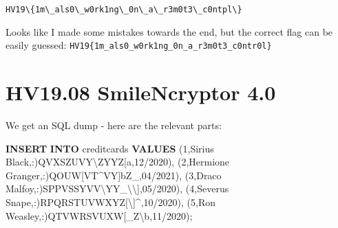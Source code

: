 \documentclass[11pt]{article}
\newenvironment{Shaded}{}{}
\newcommand{\KeywordTok}[1]{\textcolor[rgb]{0.00,0.44,0.13}{\textbf{{#1}}}}
\newcommand{\DecValTok}[1]{\textcolor[rgb]{0.25,0.63,0.44}{{#1}}}
\newcommand{\CharTok}[1]{\textcolor[rgb]{0.25,0.44,0.63}{{#1}}}
\newcommand{\StringTok}[1]{\textcolor[rgb]{0.25,0.44,0.63}{{#1}}}
\newcommand{\NormalTok}[1]{{#1}}
\begin{document}
    \begin{Verbatim}[commandchars=\\\{\}]
HV19\{1m\_als0\_w0rk1ng\_0n\_a\_r3m0t3\_c0ntpl\}
    \end{Verbatim}

    Looks like I made some mistakes towards the end, but the correct flag
can be easily guessed:
\texttt{HV19\{1m\_als0\_w0rk1ng\_0n\_a\_r3m0t3\_c0ntr0l\}}

    
\pagebreak{}
    \hypertarget{hv19.08-smilencryptor-4.0}{%
\section{HV19.08 SmileNcryptor 4.0}\label{hv19.08-smilencryptor-4.0}}

We get an SQL dump - here are the relevant parts:

\begin{Shaded}
\begin{Highlighting}[]
\KeywordTok{INSERT} \KeywordTok{INTO}\NormalTok{ \textasciigrave{}creditcards\textasciigrave{} }\KeywordTok{VALUES} 
\NormalTok{(}\DecValTok{1}\NormalTok{,}\StringTok{\textquotesingle{}Sirius Black\textquotesingle{}}\NormalTok{,}\StringTok{\textquotesingle{}:)QVXSZUVY\textbackslash{}ZYYZ[a\textquotesingle{}}\NormalTok{,}\StringTok{\textquotesingle{}12/2020\textquotesingle{}}\NormalTok{),}
\NormalTok{(}\DecValTok{2}\NormalTok{,}\StringTok{\textquotesingle{}Hermione Granger\textquotesingle{}}\NormalTok{,}\StringTok{\textquotesingle{}:)QOUW[VT\^{}VY]bZ\_\textquotesingle{}}\NormalTok{,}\StringTok{\textquotesingle{}04/2021\textquotesingle{}}\NormalTok{),}
\NormalTok{(}\DecValTok{3}\NormalTok{,}\StringTok{\textquotesingle{}Draco Malfoy\textquotesingle{}}\NormalTok{,}\StringTok{\textquotesingle{}:)SPPVSSYVV\textbackslash{}YY\_}\CharTok{\textbackslash{}\textbackslash{}}\StringTok{]\textquotesingle{}}\NormalTok{,}\StringTok{\textquotesingle{}05/2020\textquotesingle{}}\NormalTok{),}
\NormalTok{(}\DecValTok{4}\NormalTok{,}\StringTok{\textquotesingle{}Severus Snape\textquotesingle{}}\NormalTok{,}\StringTok{\textquotesingle{}:)RPQRSTUVWXYZ[\textbackslash{}]\^{}\textquotesingle{}}\NormalTok{,}\StringTok{\textquotesingle{}10/2020\textquotesingle{}}\NormalTok{),}
\NormalTok{(}\DecValTok{5}\NormalTok{,}\StringTok{\textquotesingle{}Ron Weasley\textquotesingle{}}\NormalTok{,}\StringTok{\textquotesingle{}:)QTVWRSVUXW[\_Z\textasciigrave{}}\CharTok{\textbackslash{}b}\StringTok{\textquotesingle{}}\NormalTok{,}\StringTok{\textquotesingle{}11/2020\textquotesingle{}}\NormalTok{);}
\end{Highlighting}
\end{Shaded}
\end{document}
